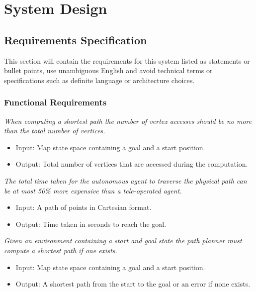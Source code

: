 \chapter{System Design}


\section{Requirements Specification}
This section will contain the requirements for this system listed as statements or bullet points, use unambiguous English and avoid technical terms or specifications such as definite language or architecture choices.

\newpage

\subsection{Functional Requirements}

\noindent
\textit{When computing a shortest path the number of vertex accesses should be no more than the total number of vertices.}
\begin{itemize}
\item Input: Map state space containing a goal and a start position.
\item Output: Total number of vertices that are accessed during the computation. \\
\end{itemize}

\noindent
\textit{The total time taken for the autonomous agent to traverse the physical path can be at most 50\% more expensive than a tele-operated agent.}
\begin{itemize}
\item Input: A path of points in Cartesian format. 
\item Output: Time taken in seconds to reach the goal. \\
\end{itemize}

\noindent
\textit{Given an environment containing a start and goal state the path planner must compute a shortest path if one exists.} 
\begin{itemize}
\item Input: Map state space containing a goal and a start position. 
\item Output: A shortest path from the start to the goal or an error if none exists.\\
\end{itemize}

